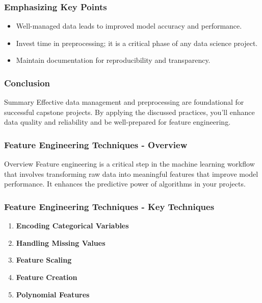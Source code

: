 \documentclass[aspectratio=169]{beamer}
\begin{document}
\begin{frame}
    \frametitle{Emphasizing Key Points}
    \begin{itemize}
        \item Well-managed data leads to improved model accuracy and performance.
        \item Invest time in preprocessing; it is a critical phase of any data science project.
        \item Maintain documentation for reproducibility and transparency.
    \end{itemize}
\end{frame}

\begin{frame}
    \frametitle{Conclusion}
    \begin{block}{Summary}
        Effective data management and preprocessing are foundational for successful capstone projects. By applying the discussed practices, you'll enhance data quality and reliability and be well-prepared for feature engineering.
    \end{block}
\end{frame}

\begin{frame}[fragile]
    \frametitle{Feature Engineering Techniques - Overview}
    \begin{block}{Overview}
        Feature engineering is a critical step in the machine learning workflow that involves transforming raw data into meaningful features that improve model performance. It enhances the predictive power of algorithms in your projects.
    \end{block}
\end{frame}

\begin{frame}[fragile]
    \frametitle{Feature Engineering Techniques - Key Techniques}
    \begin{enumerate}
        \item \textbf{Encoding Categorical Variables}
        \item \textbf{Handling Missing Values}
        \item \textbf{Feature Scaling}
        \item \textbf{Feature Creation}
        \item \textbf{Polynomial Features}
    \end{enumerate}
\end{frame}
\end{document}
